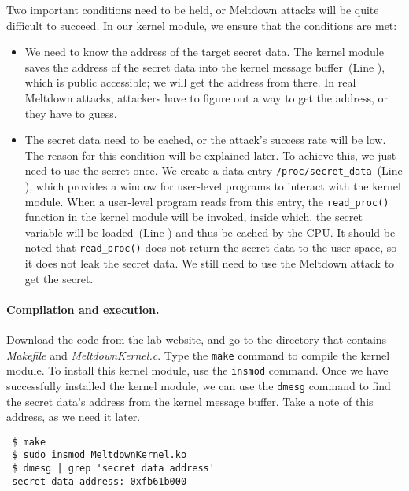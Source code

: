 Two important conditions need to be held, or Meltdown attacks will be quite difficult to
succeed. In our kernel module, we ensure that the conditions are met:

\begin{itemize}
\item We need to know the address of the target secret data. 
The kernel module saves the address of the secret data into the kernel message buffer~(Line
), which is public accessible; we will get the address from there. In real Meltdown
attacks, attackers have to figure out a way to get the address, or they have to guess.


\item The secret data need to be cached, or the attack's success rate will be low. 
The reason for this condition will be explained later. To achieve this, we just need to use the secret once. 
We create a data entry \texttt{/proc/secret\_data}~(Line ), which provides a window
for user-level programs to interact with the kernel module. When a user-level program reads
from this entry, the \texttt{read\_proc()} function in the kernel module will be invoked,
inside which, the secret variable will be loaded~(Line ) and thus be cached by the CPU. 
It should be noted that \texttt{read\_proc()} does not return
the secret data to the user space, so it does not leak the secret data. We still need
to use the Meltdown attack to get the secret.
\end{itemize}


\paragraph{Compilation and execution.}
Download the code from the lab website, and go to the directory that contains 
\textit{Makefile} and \textit{MeltdownKernel.c}. Type the \texttt{make} command
to compile the kernel module. 
To install this kernel module, use the \texttt{insmod} command. 
Once we have successfully installed the kernel module, we can 
use the \texttt{dmesg} command to find the 
secret data's address from the kernel message buffer. Take a note of this address, as we need
it later.

\begin{lstlisting}
 $ make
 $ sudo insmod MeltdownKernel.ko
 $ dmesg | grep 'secret data address'
 secret data address: 0xfb61b000
\end{lstlisting}
 




